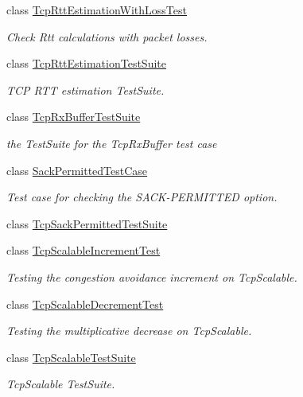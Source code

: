 \begin{DoxyCompactItemize}
class \hyperlink{classTcpRttEstimationWithLossTest}{Tcp\+Rtt\+Estimation\+With\+Loss\+Test}
\begin{DoxyCompactList}\small\item\em Check Rtt calculations with packet losses. \end{DoxyCompactList}\item 
class \hyperlink{classTcpRttEstimationTestSuite}{Tcp\+Rtt\+Estimation\+Test\+Suite}
\begin{DoxyCompactList}\small\item\em T\+CP R\+TT estimation Test\+Suite. \end{DoxyCompactList}\item 
class \hyperlink{classTcpRxBufferTestSuite}{Tcp\+Rx\+Buffer\+Test\+Suite}
\begin{DoxyCompactList}\small\item\em the Test\+Suite for the Tcp\+Rx\+Buffer test case \end{DoxyCompactList}\item 
class \hyperlink{classSackPermittedTestCase}{Sack\+Permitted\+Test\+Case}
\begin{DoxyCompactList}\small\item\em Test case for checking the S\+A\+C\+K-\/\+P\+E\+R\+M\+I\+T\+T\+ED option. \end{DoxyCompactList}\item 
class \hyperlink{classTcpSackPermittedTestSuite}{Tcp\+Sack\+Permitted\+Test\+Suite}
\item 
class \hyperlink{classTcpScalableIncrementTest}{Tcp\+Scalable\+Increment\+Test}
\begin{DoxyCompactList}\small\item\em Testing the congestion avoidance increment on Tcp\+Scalable. \end{DoxyCompactList}\item 
class \hyperlink{classTcpScalableDecrementTest}{Tcp\+Scalable\+Decrement\+Test}
\begin{DoxyCompactList}\small\item\em Testing the multiplicative decrease on Tcp\+Scalable. \end{DoxyCompactList}\item 
class \hyperlink{classTcpScalableTestSuite}{Tcp\+Scalable\+Test\+Suite}
\begin{DoxyCompactList}\small\item\em Tcp\+Scalable Test\+Suite. \end{DoxyCompactList}\item 

\end{DoxyCompactItemize}
